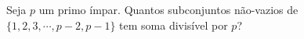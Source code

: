 Seja $p$ um primo ímpar. Quantos subconjuntos não-vazios de $\{1, 2, 3, \cdots, p-2, p-1\}$ tem soma divisível por $p$?